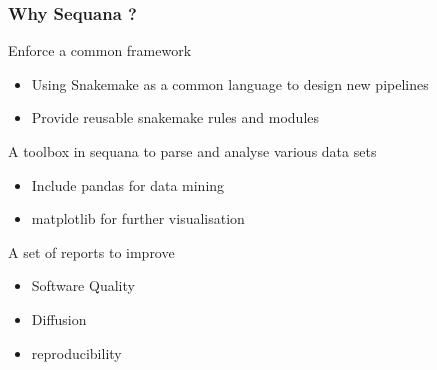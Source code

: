 \begin{frame}
    \frametitle{Why Sequana ?}
    
    \begin{block}{Enforce a common framework}
    \begin{itemize}
        \item Using Snakemake as a common language to design new pipelines
        \item Provide reusable snakemake rules and modules
    \end{itemize} 
     \end{block}

    \begin{block}{A toolbox in sequana to parse and analyse various data sets }
    \begin{itemize}
        \item Include pandas for data mining
        \item matplotlib for further visualisation
    \end{itemize} 
    \end{block}

    \begin{block}{A set of reports to improve}
    \begin{itemize}
        \item Software Quality
        \item Diffusion
        \item reproducibility
    \end{itemize} 
    \end{block}
    
\end{frame}


